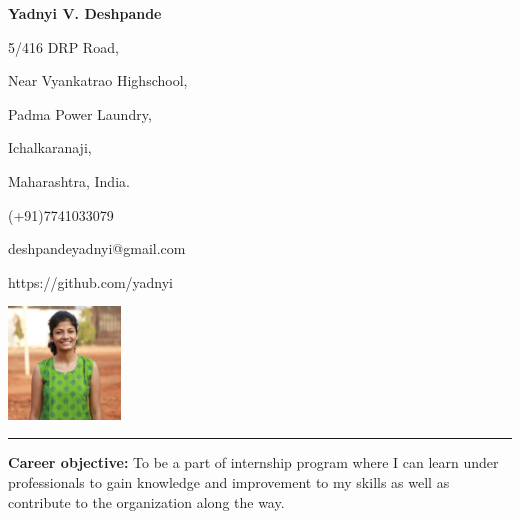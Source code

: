 \documentclass[a4paper,11pt]{article}
\begin{document}
	\begin{flushleft}
	 	\begin{Huge}
			\textbf{Yadnyi V. Deshpande}
		\end{Huge}
	\end{flushleft}

		\begin{minipage}[b]{0.33333\textwidth}
			\raggedright
			5/416 DRP Road,\par
			Near Vyankatrao Highschool,\par
			Padma Power Laundry, \par
			Ichalkaranaji,\par
			Maharashtra, India.
		\end{minipage}%
		\begin{minipage}[b]{0.33333\textwidth}
			\centering
			\begin{large}
				\raggedright
				(+91)7741033079\par
				deshpandeyadnyi@gmail.com\par
				https://github.com/yadnyi\par
			\end{large}
		\end{minipage}%
		\begin{minipage}[b]{0.33333\textwidth}
			\raggedleft
			\includegraphics[width = 30mm, height = 30mm]{yadnyi.JPG}
		\end{minipage}%
		
\noindent\rule{15cm}{0.4pt}	

\begin{minipage}[t]{1\textwidth}
			\raggedright\smallskip
			\begin{Large}
				\textbf{Career objective:}\medskip\linebreak%
				{\small To be a part of internship program where I can learn under professionals to gain knowledge and improvement to my skills as well as contribute to the organization along the way.}\linebreak%
			\end{Large}
		\end{minipage}%
		\vspace{0.35cm}
\end{document}

